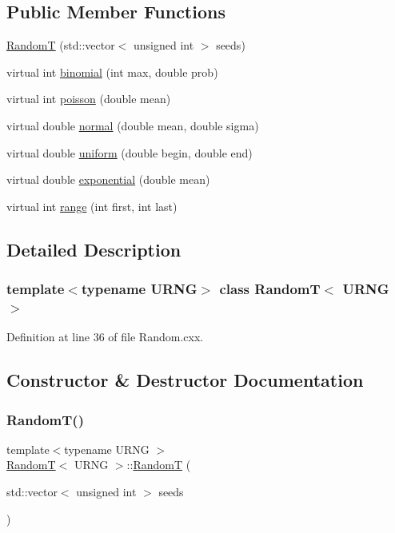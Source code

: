 \subsection*{Public Member Functions}
\begin{DoxyCompactItemize}
\item 
\hyperlink{class_random_t_a6bf66fb82351cbaf28317350dc1bc6f5}{RandomT} (std\+::vector$<$ unsigned int $>$ seeds)
\item 
virtual int \hyperlink{class_random_t_ac156dfd6f81d0e72256bcd5c1e272a47}{binomial} (int max, double prob)
\item 
virtual int \hyperlink{class_random_t_ab8c7ac8421629f54a240842e5c86b4a4}{poisson} (double mean)
\item 
virtual double \hyperlink{class_random_t_a1dd7e5415d2ab8c7b4544cc770ec38d9}{normal} (double mean, double sigma)
\item 
virtual double \hyperlink{class_random_t_a22dc8bd9d6e2b7db0bc5ded8fd82220d}{uniform} (double begin, double end)
\item 
virtual double \hyperlink{class_random_t_ab289d92c8d8c36fd6951b85579373d75}{exponential} (double mean)
\item 
virtual int \hyperlink{class_random_t_a2c8bd74ddb85c405a5bc2be6f9edab55}{range} (int first, int last)
\end{DoxyCompactItemize}


\subsection{Detailed Description}
\subsubsection*{template$<$typename U\+R\+NG$>$\newline
class Random\+T$<$ U\+R\+N\+G $>$}



Definition at line 36 of file Random.\+cxx.



\subsection{Constructor \& Destructor Documentation}
\mbox{\label{class_random_t_a6bf66fb82351cbaf28317350dc1bc6f5}} 
\subsubsection{\texorpdfstring{Random\+T()}{RandomT()}}
{\footnotesize\ttfamily template$<$typename U\+R\+NG $>$ \\
\hyperlink{class_random_t}{RandomT}$<$ U\+R\+NG $>$\+::\hyperlink{class_random_t}{RandomT} (\begin{DoxyParamCaption}\item[{std\+::vector$<$ unsigned int $>$}]{seeds }\end{DoxyParamCaption})\hspace{0.3cm}{\ttfamily [inline]}}




